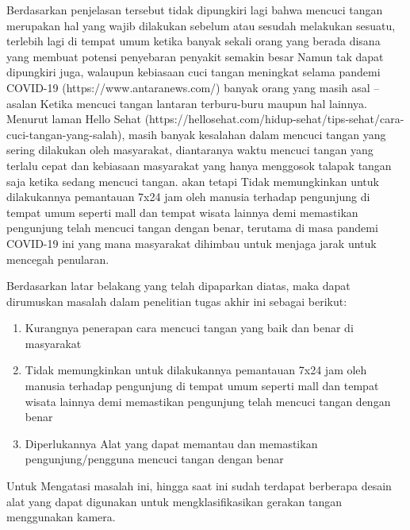 \documentclass[a4paper]{article}
\begin{document}
		\hspace{6mm}Berdasarkan penjelasan tersebut tidak dipungkiri lagi bahwa mencuci tangan merupakan hal yang wajib dilakukan sebelum atau sesudah melakukan sesuatu, terlebih lagi di tempat umum ketika banyak sekali orang yang berada disana yang membuat potensi penyebaran penyakit semakin besar Namun tak dapat dipungkiri juga, walaupun kebiasaan cuci tangan meningkat selama pandemi COVID-19 (https://www.antaranews.com/) banyak orang yang masih asal – asalan Ketika mencuci tangan lantaran terburu-buru maupun hal lainnya. Menurut laman Hello Sehat (https://hellosehat.com/hidup-sehat/tips-sehat/cara-cuci-tangan-yang-salah), masih banyak kesalahan dalam mencuci tangan yang sering dilakukan oleh masyarakat, diantaranya waktu mencuci tangan yang terlalu cepat dan kebiasaan masyarakat yang hanya menggosok talapak tangan saja ketika sedang mencuci tangan. akan tetapi Tidak memungkinkan untuk dilakukannya pemantauan 7x24 jam oleh manusia terhadap pengunjung di tempat umum seperti mall dan tempat wisata lainnya demi memastikan pengunjung telah mencuci tangan dengan benar, terutama di masa pandemi COVID-19 ini yang mana masyarakat dihimbau untuk menjaga jarak untuk mencegah penularan.

		\hspace{6mm}Berdasarkan latar belakang yang telah dipaparkan diatas, maka dapat dirumuskan masalah dalam penelitian tugas akhir ini sebagai berikut:

		\begin{enumerate}
			\item Kurangnya penerapan cara mencuci tangan yang baik dan benar di masyarakat
			\item Tidak memungkinkan untuk dilakukannya pemantauan 7x24 jam oleh manusia terhadap pengunjung di tempat umum seperti mall dan tempat wisata lainnya demi memastikan pengunjung telah mencuci tangan dengan benar
			\item Diperlukannya Alat yang dapat memantau dan memastikan pengunjung/pengguna mencuci tangan dengan benar	
		\end{enumerate}

		\hspace{6mm}Untuk Mengatasi masalah ini, hingga saat ini sudah terdapat berberapa desain alat yang dapat digunakan untuk mengklasifikasikan gerakan tangan menggunakan kamera.
\end{document}
